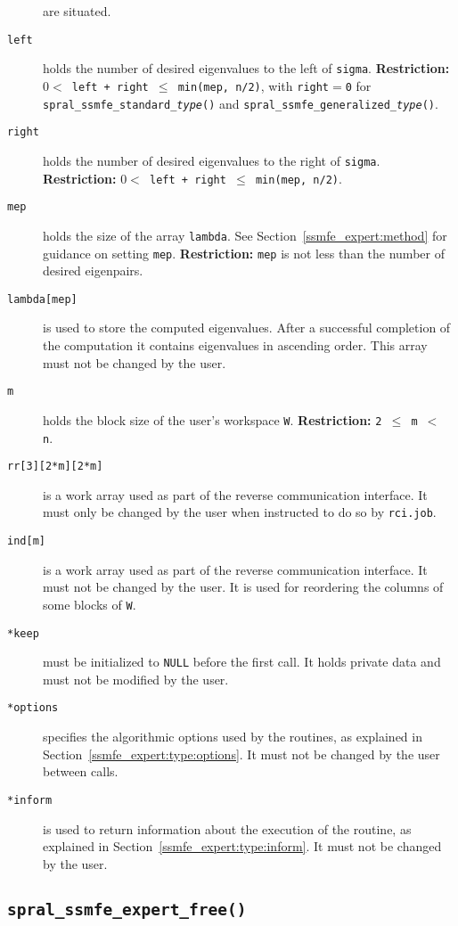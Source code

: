 \begin{description}
are situated.
%
\item[\texttt{left}] holds the number of desired eigenvalues to the left of {\tt sigma}.
{\bf Restriction:} {\tt $0 < $ left + right $\le$ min(mep, n/2)},
with {\tt right}$=${\tt 0} for {\tt spral\_ssmfe\_standard\_\textit{type}()} and
{\tt spral\_ssmfe\_generalized\_\textit{type}()}.
%
\item[\texttt{right}] holds the number of desired eigenvalues to the right of {\tt sigma}.
{\bf Restriction:} {\tt $0 < $ left + right $\le$ min(mep, n/2)}.
%
\item[\texttt{mep}] holds the size of the array {\tt lambda}.
See Section~\ref{ssmfe_expert:method} for guidance on
setting {\tt mep}.
{\bf Restriction:} 
{\tt mep} is not less than the number of desired eigenpairs.
%
\item[\texttt{lambda[mep]}] is
used to store the computed eigenvalues.
After a successful completion of the computation
it contains eigenvalues in ascending order.
This array must not be changed by the user.
%
\item[\texttt{m}] holds the block size of the user's workspace {\tt W}. 
{\bf Restriction:} {\tt 2 $\le$ m $<$ n}.
%
\item[\texttt{rr[3][2*m][2*m]}] is a work array used as part of the reverse communication interface.
It must only be changed by the user when
instructed to do so by 
{\tt rci.job}.
%
\item[\texttt{ind[m]}] is a work array used as part of the reverse communication interface.
It must not be changed by the user.
It is used for reordering the columns of some blocks of {\tt W}.
%
\item[\texttt{*keep}] must be initialized to \texttt{NULL} before the first call.
It holds private data and must not be modified by the user.
%
\item[\texttt{*options}] specifies the algorithmic options used by the routines,
as explained in Section~\ref{ssmfe_expert:type:options}.
It must not be changed by the user between calls.
%
\item[\texttt{*inform}] is used to return information about the execution of the
routine, as explained in Section~\ref{ssmfe_expert:type:inform}.
It must not be changed by the user.
%
\end{description}

\subsection{\texttt{spral\_ssmfe\_expert\_free()}}

